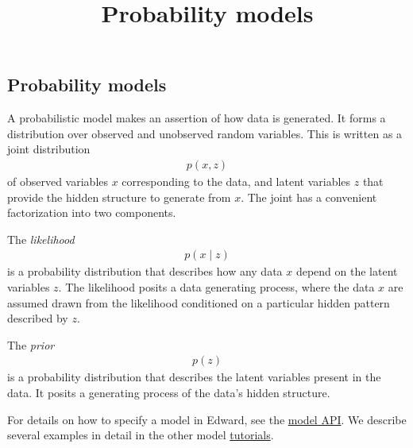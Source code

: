 \title{Probability models}

\subsection{Probability models}

A probabilistic model makes an assertion of how data is generated.
It forms a distribution over observed and unobserved random variables.
This is written as a joint distribution
\begin{align*}
  p(x, z)
\end{align*}
of observed variables $x$ corresponding to the data, and latent
variables $z$ that provide the hidden structure to generate from $x$.
The joint has a convenient factorization into two components.

The \emph{likelihood}
\begin{align*}
  p(x \mid z)
\end{align*}
is a probability distribution that describes how any data $x$ depend
on the latent variables $z$. The likelihood posits a data generating
process, where the data $x$ are assumed drawn from the likelihood
conditioned on a particular hidden pattern described by $z$.

The \emph{prior}
\begin{align*}
  p(z)
\end{align*}
is a probability distribution that describes the latent variables
present in the data. It posits a generating process of the
data's hidden structure.

For details on how to specify a model in Edward, see the
\href{api/models_models.html}{model API}. We describe several examples in detail
in the
other model \href{tutorials.html}{tutorials}.
